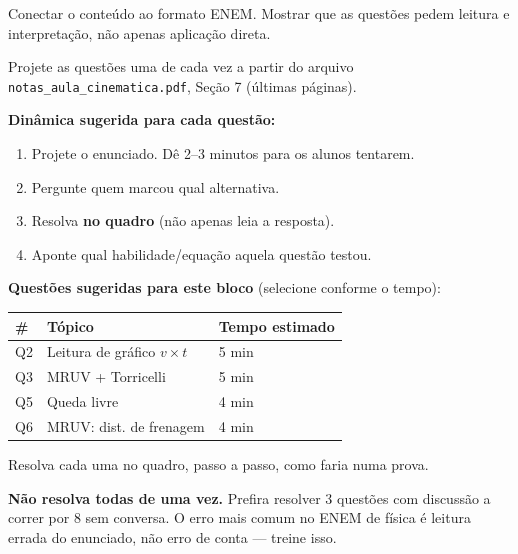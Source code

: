 \documentclass[12pt,a4paper]{article}
\begin{document}
\begin{tcolorbox}[blocobox={Objetivos}]
  Conectar o conte\'udo ao formato ENEM. Mostrar que as quest\~oes
  pedem leitura e interpreta\c{c}\~ao, n\~ao apenas aplica\c{c}\~ao direta.
\end{tcolorbox}

\begin{tcolorbox}[projetorbox]
  Projete as quest\~oes uma de cada vez a partir do arquivo
  \texttt{notas\_aula\_cinematica.pdf}, Se\c{c}\~ao 7 (\'ultimas p\'aginas).

  \medskip
  \textbf{Din\^amica sugerida para cada quest\~ao:}
  \begin{enumerate}[nosep, label=\arabic*.]
    \item Projete o enunciado. D\^e 2--3 minutos para os alunos tentarem.
    \item Pergunte quem marcou qual alternativa.
    \item Resolva \textbf{no quadro} (n\~ao apenas leia a resposta).
    \item Aponte qual habilidade/equa\c{c}\~ao aquela quest\~ao testou.
  \end{enumerate}
\end{tcolorbox}

\begin{tcolorbox}[quadrobox]
  \textbf{Quest\~oes sugeridas para este bloco} (selecione conforme o tempo):

  \medskip
  \begin{tabular}{lll}
    \toprule
    \# & T\'opico & Tempo estimado \\
    \midrule
    Q2 & Leitura de gr\'afico $v\times t$ & 5 min \\
    Q3 & MRUV + Torricelli & 5 min \\
    Q5 & Queda livre & 4 min \\
    Q6 & MRUV: dist. de frenagem & 4 min \\
    \bottomrule
  \end{tabular}

  \medskip
  Resolva cada uma no quadro, passo a passo, como faria numa prova.
\end{tcolorbox}

\begin{tcolorbox}[dicabox]
  \textbf{N\~ao resolva todas de uma vez.} Prefira resolver 3 quest\~oes
  com discuss\~ao a correr por 8 sem conversa. O erro mais comum no
  ENEM de f\'isica \'e leitura errada do enunciado, n\~ao erro de conta
  --- treine isso.
\end{tcolorbox}
\end{document}
